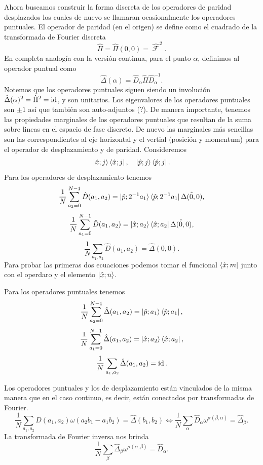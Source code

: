 \documentclass[a4paper]{report}
\let\H\relax
\DeclareMathOperator{\H}{\mathcal H}
\DeclareMathOperator{\id}{id}
\DeclareMathOperator{\Fr}{\mathcal{F}\!}
\begin{document}
  Ahora buscamos construir la forma discreta de los
  operadores de paridad desplazados los cuales de nuevo se
  llamaran ocasionalmente los operadores puntuales. El
  operador de paridad (en el origen) se define como el
  cuadrado de la transformada de Fourier discreta
  \[
    \hat{\Pi}
    = \hat{\Pi}(0,0)
    = \hat{\Fr}^2.
  \] 
  En completa analogía con la versión continua, para el
  punto $\alpha$, definimos al operador puntual como
  \begin{equation}
    \hat{\Delta}(\alpha)
    = \hat{D}_\alpha \hat{\Pi} \hat{D}_{\alpha}^{-1}.
  \end{equation}
  Notemos que los operadores puntuales siguen siendo un
  involución $\hat{\Delta}(\alpha)^2 = \hat{\Pi}^2 =
  \id_{\H}$, y son unitarios. Los eigenvalores de los
  operadores puntuales son $\pm 1$ así que también son
  auto-adjuntos (?). De manera importante, tenemos las
  propiedades marginales de los operadores puntuales que
  resultan de la suma sobre lineas en el espacio de fase
  discreto. De nuevo las marginales más sencillas son las
  correspondientes al eje horizontal y el vertial (posición
  y momentum) para el operador de desplazamiento y de
  paridad. Consideremos
  \[
    \ket{\hat{x}; j}\bra{\hat{x}; j},
    \quad
    \ket{\hat{p}; j}\bra{\hat{p}; j}.
  \] 
  Para los operadores de desplazamiento tenemos
  \[
    \frac{1}{N} \sum_{a_2 = 0}^{N-1} \hat{D}(a_1,a_2)
    = \ket{\hat{p}; 2^{-1}a_1} \bra{\hat{p}; 2^{-1}a_1}
    \hat{\Delta(0,0)},
  \] 
  \[
    \frac{1}{N} \sum_{a_1=0}^{N-1} \hat{D}(a_1,a_2)
    = \ket{\hat{x}; a_2} \bra{\hat{x}; a_2}
    \hat{\Delta(0,0)},
  \] 
  \[
    \frac{1}{N} \sum_{a_1,a_2}^{} \hat{D}(a_1,a_2)
    = \hat{\Delta}(0,0).
  \]
  Para probar las primeras dos ecuaciones podemos tomar el
  funcional $\bra{\hat{x}; m}$ junto con el operdaro y el
  elemento $\ket{\hat{x}; n}$.

  Para los operadores puntuales tenemos
  \[
    \frac{1}{N} \sum_{a_2 = 0}^{N-1} \hat{\Delta}(a_1,a_2)
    = \ket{\hat{p}; a_1}\bra{\hat{p}; a_1},
  \] 
  \[
    \frac{1}{N} \sum_{a_1 = 0}^{N-1} \hat{\Delta}(a_1,a_2)
    = \ket{\hat{x}; a_2}\bra{\hat{x}; a_2},
  \] 
  \[
    \frac{1}{N} \sum_{a_1,a_2}^{} \hat{\Delta}(a_1,a_2) =
    \id_{\H}.
  \] 

  Los operadores puntuales y los de desplazamiento están
  vinculados de la misma manera que en el caso continuo, es
  decir, están conectados por transformadas de Fourier.
  \[
    \frac{1}{N}
    \sum_{a_1,a_2}^{} \hat{D}(a_1,a_2)\omega(a_2b_1-a_1b_2)
    = \hat{\Delta}(b_1,b_2)
    \iff
    \frac{1}{N} \sum_{\alpha}^{} \hat{D}_{\alpha}
    \omega^{\sigma(\beta,\alpha)} 
    = \hat{\Delta}_\beta.
  \] 
  La transformada de Fourier inversa nos brinda 
  \[
    \frac{1}{N} \sum_{\beta}^{} \hat{\Delta}_\beta
    \omega^{\sigma(\alpha,\beta)}
    = \hat{D}_\alpha.
  \] 
\end{document}
